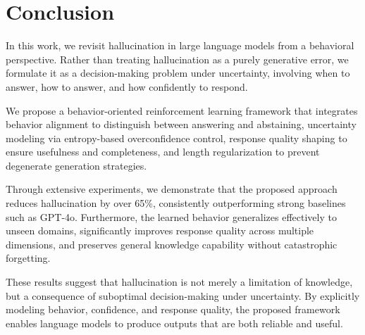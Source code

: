 \section{Conclusion}

In this work, we revisit hallucination in large language models from a behavioral perspective. 
Rather than treating hallucination as a purely generative error, we formulate it as a decision-making problem under uncertainty, involving when to answer, how to answer, and how confidently to respond.

We propose a behavior-oriented reinforcement learning framework that integrates behavior alignment to distinguish between answering and abstaining, uncertainty modeling via entropy-based overconfidence control, response quality shaping to ensure usefulness and completeness, and length regularization to prevent degenerate generation strategies.

Through extensive experiments, we demonstrate that the proposed approach reduces hallucination by over 65\%, consistently outperforming strong baselines such as GPT-4o. 
Furthermore, the learned behavior generalizes effectively to unseen domains, significantly improves response quality across multiple dimensions, and preserves general knowledge capability without catastrophic forgetting.

These results suggest that hallucination is not merely a limitation of knowledge, but a consequence of suboptimal decision-making under uncertainty. 
By explicitly modeling behavior, confidence, and response quality, the proposed framework enables language models to produce outputs that are both reliable and useful.